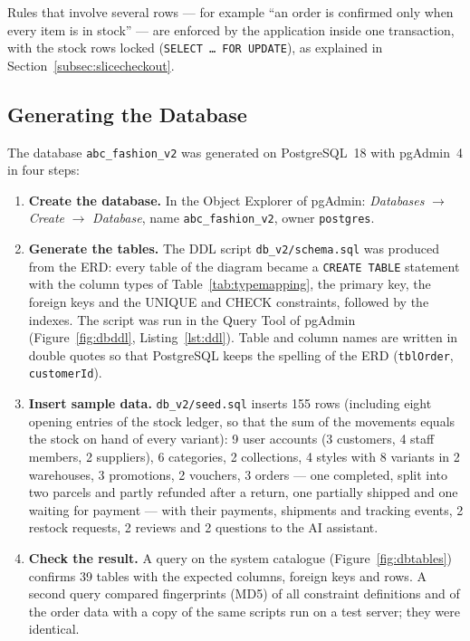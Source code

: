 Rules that involve several rows --- for example ``an order is confirmed only when every item is in stock'' --- are enforced by the application inside one transaction, with the stock rows locked (\texttt{SELECT \ldots{} FOR UPDATE}), as explained in Section~\ref{subsec:slicecheckout}.

\subsection{Generating the Database}
\label{subsec:generatedb}
The database \texttt{abc\_fashion\_v2} was generated on PostgreSQL~18 with pgAdmin~4 in four steps:
\begin{enumerate}
  \item \textbf{Create the database.} In the Object Explorer of pgAdmin: \emph{Databases} $\rightarrow$ \emph{Create} $\rightarrow$ \emph{Database}, name \texttt{abc\_fashion\_v2}, owner \texttt{postgres}.
  \item \textbf{Generate the tables.} The DDL script \texttt{db\_v2/schema.sql} was produced from the ERD: every table of the diagram became a \texttt{CREATE TABLE} statement with the column types of Table~\ref{tab:typemapping}, the primary key, the foreign keys and the UNIQUE and CHECK constraints, followed by the indexes. The script was run in the Query Tool of pgAdmin (Figure~\ref{fig:dbddl}, Listing~\ref{lst:ddl}). Table and column names are written in double quotes so that PostgreSQL keeps the spelling of the ERD (\texttt{tblOrder}, \texttt{customerId}).
  \item \textbf{Insert sample data.} \texttt{db\_v2/seed.sql} inserts 155 rows (including eight opening entries of the stock ledger, so that the sum of the movements equals the stock on hand of every variant): 9 user accounts (3 customers, 4 staff members, 2 suppliers), 6 categories, 2 collections, 4 styles with 8 variants in 2 warehouses, 3 promotions, 2 vouchers, 3 orders --- one completed, split into two parcels and partly refunded after a return, one partially shipped and one waiting for payment --- with their payments, shipments and tracking events, 2 restock requests, 2 reviews and 2 questions to the AI assistant.
  \item \textbf{Check the result.} A query on the system catalogue (Figure~\ref{fig:dbtables}) confirms 39 tables with the expected columns, foreign keys and rows. A second query compared fingerprints (MD5) of all constraint definitions and of the order data with a copy of the same scripts run on a test server; they were identical.
\end{enumerate}

